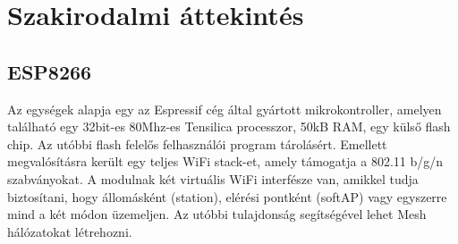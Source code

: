 



\chapter{Szakirodalmi áttekintés}
\section{ESP8266}
Az egységek alapja egy az Espressif cég által gyártott mikrokontroller, amelyen található egy 32bit-es 80Mhz-es Tensilica processzor, 50kB RAM, egy külső flash chip. Az utóbbi flash felelős felhasználói program tárolásért. Emellett megvalósításra került egy teljes WiFi stack-et, amely támogatja a 802.11 b/g/n szabványokat. A modulnak két virtuális WiFi interfésze van, amikkel tudja biztosítani, hogy állomásként (station), elérési pontként (softAP) vagy egyszerre mind a két módon üzemeljen. Az utóbbi tulajdonság segítségével lehet Mesh hálózatokat létrehozni.

